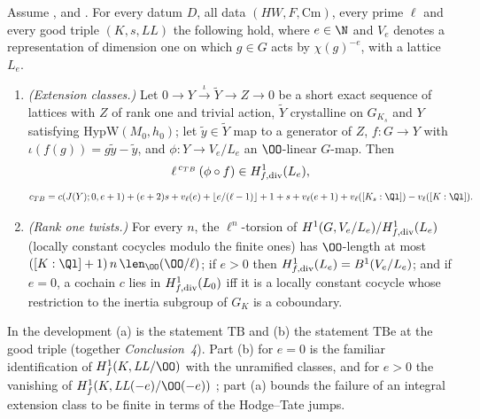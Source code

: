 \begin{theorem}[Theorem TB]\label{pf:sh-hodge:tb}
Assume \shhodgeBK, \shhodgeLTD{} and \shhodgeLEC. For every datum $D$, all data $(HW,F,\mathrm{Cm})$, every prime $\ell$ and every good triple
$(K,s,\mathit{LL})$ the following hold, where $e\in\N$ and $V_e$ denotes a representation of dimension one on which $g\in G$ acts by
$\chi(g)^{-e}$, with a lattice $L_e$.
\begin{enumerate}[label=(\alph*)]
\item \emph{(Extension classes.)} Let $0\to Y\xrightarrow{\iota}\tilde Y\to Z\to0$ be a short exact sequence of lattices with $Z$ of rank one
  and trivial action, $\tilde Y$ crystalline on $G_{K_s}$ and $Y$ satisfying $\mathrm{HypW}(M_0,h_0)$; let $\tilde y\in\tilde Y$ map to a generator
  of $Z$, $f\colon G\to Y$ with $\iota(f(g))=g\tilde y-\tilde y$, and $\phi\colon Y\to V_e/L_e$ an $\OO$-linear $G$-map. Then
  \[
  \ell^{\,c_{TB}}\,(\phi\circ f)\in H^1_{f,\mathrm{div}}(L_e),
  \]
  \[
  c_{TB}=c(J(Y);0,e+1)+(e+2)s+v_\ell(e)+\lfloor e/(\ell-1)\rfloor+1+s+v_\ell(e+1)+v_\ell([K_s:\Ql])-v_\ell([K:\Ql]).
  \]
\item \emph{(Rank one twists.)} For every $n$, the $\ell^n$-torsion of $H^1(G,V_e/L_e)/H^1_{f,\mathrm{div}}(L_e)$ (locally constant cocycles modulo the
  finite ones) has $\OO$-length at most $([K:\Ql]+1)\,n\,\len_\OO(\OO/\ell)$; if $e>0$ then $H^1_{f,\mathrm{div}}(L_e)=B^1(V_e/L_e)$; and if $e=0$, a cochain
  $c$ lies in $H^1_{f,\mathrm{div}}(L_0)$ iff it is a locally constant cocycle whose restriction to the inertia subgroup of $G_K$ is a coboundary.
\end{enumerate}
\end{theorem}

\begin{remark}
In the development (a) is the statement $\mathrm{TB}$ and (b) the statement $\mathrm{TBe}$ at the good triple (together \emph{Conclusion~4}).
Part (b) for $e=0$ is the familiar identification of $H^1_f(K,\mathit{LL}/\OO)$ with the unramified classes, and for $e>0$ the vanishing of
$H^1_f(K,\mathit{LL}(-e)/\OO(-e))$ \cite[\S3]{BlochKato1990}; part (a) bounds the failure of an integral extension class to be finite in terms
of the Hodge--Tate jumps.
\end{remark}

